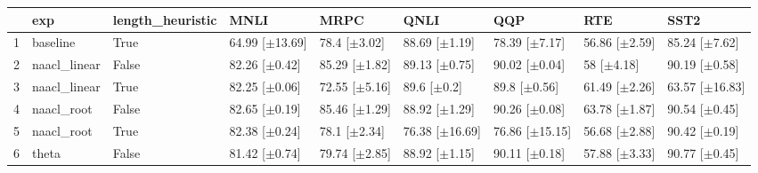 \begin{table}[ht]
\centering
\begin{tabular}{rllllllll}
  \hline
 & exp & length_heuristic & MNLI & MRPC & QNLI & QQP & RTE & SST2 \\ 
  \hline
1 & baseline & True & 64.99 [$\pm$13.69] & 78.4 [$\pm$3.02] & 88.69 [$\pm$1.19] & 78.39 [$\pm$7.17] & 56.86 [$\pm$2.59] & 85.24 [$\pm$7.62] \\ 
  2 & naacl_linear & False & 82.26 [$\pm$0.42] & 85.29 [$\pm$1.82] & 89.13 [$\pm$0.75] & 90.02 [$\pm$0.04] & 58 [$\pm$4.18] & 90.19 [$\pm$0.58] \\ 
  3 & naacl_linear & True & 82.25 [$\pm$0.06] & 72.55 [$\pm$5.16] & 89.6 [$\pm$0.2] & 89.8 [$\pm$0.56] & 61.49 [$\pm$2.26] & 63.57 [$\pm$16.83] \\ 
  4 & naacl_root & False & 82.65 [$\pm$0.19] & 85.46 [$\pm$1.29] & 88.92 [$\pm$1.29] & 90.26 [$\pm$0.08] & 63.78 [$\pm$1.87] & 90.54 [$\pm$0.45] \\ 
  5 & naacl_root & True & 82.38 [$\pm$0.24] & 78.1 [$\pm$2.34] & 76.38 [$\pm$16.69] & 76.86 [$\pm$15.15] & 56.68 [$\pm$2.88] & 90.42 [$\pm$0.19] \\ 
  6 & theta & False & 81.42 [$\pm$0.74] & 79.74 [$\pm$2.85] & 88.92 [$\pm$1.15] & 90.11 [$\pm$0.18] & 57.88 [$\pm$3.33] & 90.77 [$\pm$0.45] \\ 
   \hline
\end{tabular}
\end{table}
